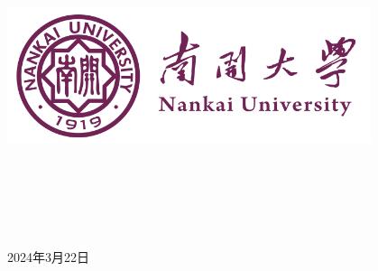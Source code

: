 \documentclass[a4paper]{article}
\newcommand{\HRule}{\rule{\linewidth}{0.5mm}}%
\begin{document}
\renewcommand{\contentsname}{目\ 录}
\renewcommand{\appendixname}{附录}
\renewcommand{\appendixpagename}{附录}
\renewcommand{\refname}{参考文献} 
\renewcommand{\figurename}{图}
\renewcommand{\tablename}{表}
\renewcommand{\today}{\number\year 年 \number\month 月 \number\day 日}

\begin{titlepage}
    \begin{center}
    \includegraphics[width=0.8\textwidth]{NKU.png}\\[1cm]
    \vspace{20mm}
		\textbf{\huge\textbf{}}\\[0.5cm]
		\textbf{\huge{}}\\[2.3cm]
		\textbf{\Huge\textbf{}}

		\vspace{\fill}
    
    \centering
    \textsc{\LARGE {}}\\[0.5cm]
    \textsc{\LARGE {}}\\[0.5cm]
    \textsc{\LARGE {}}\\[0.5cm]
    
    \vfill
    {\Large 2024年3月22日}
    \end{center}
\end{titlepage}

\newpage
\thispagestyle{empty}
\renewcommand{\abstractname}{\kaishu \sihao \textbf{摘要}}
\renewcommand {\thefigure}{\thesection{}.\arabic{figure}}%
\renewcommand{\figurename}{图}
\renewcommand{\contentsname}{目录}  


\clearpage
\tableofcontents
\newpage
\end{document}
